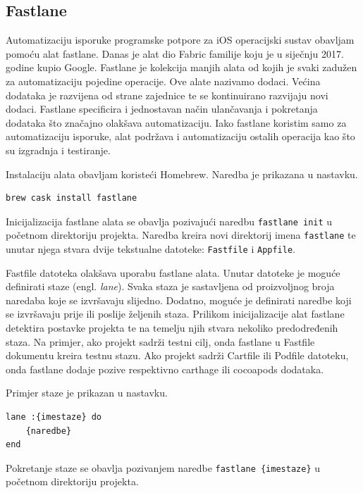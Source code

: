 \documentclass[times, utf8, diplomski, numeric]{fer}
\newcommand{\eng}[1]{(engl. \textit{#1})}
\begin{document}
\begin{appendices}
\chapter{Fastlane}

Automatizaciju isporuke programske potpore za iOS operacijski sustav obavljam pomoću alat fastlane. Danas je alat dio Fabric familije koju je u siječnju 2017. godine kupio Google. Fastlane je kolekcija manjih alata od kojih je svaki zadužen za automatizaciju pojedine operacije. Ove alate nazivamo dodaci. Većina dodataka je razvijena od strane zajednice te se kontinuirano razvijaju novi dodaci. Fastlane specificira i jednostavan način ulančavanja i pokretanja dodataka što značajno olakšava automatizaciju. Iako fastlane koristim samo za automatizaciju isporuke, alat podržava i automatizaciju ostalih operacija kao što su izgradnja i testiranje\citep{fastlane}.

Instalaciju alata obavljam koristeći Homebrew. Naredba je prikazana u nastavku.

\begin{verbatim}
brew cask install fastlane
\end{verbatim}

Inicijalizacija fastlane alata se obavlja pozivajući naredbu \verb|fastlane init| u početnom direktoriju projekta. Naredba kreira novi direktorij imena \verb|fastlane| te unutar njega stvara dvije tekstualne datoteke: \verb|Fastfile| i \verb|Appfile|.

Fastfile datoteka olakšava uporabu fastlane alata. Unutar datoteke je moguće definirati staze \eng{lane}. Svaka staza je sastavljena od proizvoljnog broja naredaba koje se izvršavaju slijedno. Dodatno, moguće je definirati naredbe koji se izvršavaju prije ili poslije željenih staza. Prilikom inicijalizacije alat fastlane detektira postavke projekta te na temelju njih stvara nekoliko predodređenih staza. Na primjer, ako projekt sadrži testni cilj, onda fastlane u Fastfile dokumentu kreira testnu stazu. Ako projekt sadrži Cartfile ili Podfile datoteku, onda fastlane dodaje pozive respektivno carthage ili cocoapods dodataka.

Primjer staze je prikazan u nastavku.

\begin{verbatim}
lane :{imestaze} do
    {naredbe}
end
\end{verbatim}

Pokretanje staze se obavlja pozivanjem naredbe \verb|fastlane {imestaze}| u početnom direktoriju projekta.


\end{appendices}
\end{document}
